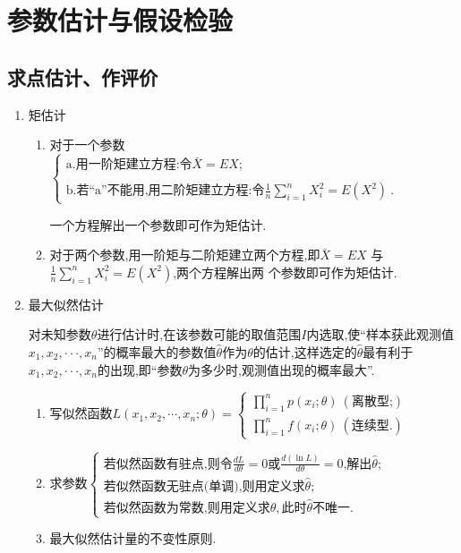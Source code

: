\chapter{参数估计与假设检验}
\section{求点估计、作评价}
\begin{enumerate}
      \item 矩估计
            \begin{enumerate}
                  \item 对于一个参数$\begin{cases}\text{a.用一阶矩建立方程:令}\bar{X}=EX;\\\\\text{b.若“a”不能用,用二阶矩建立方程:令}\frac1n\sum_{i=1}^nX_i^2=E(X^2)\:.\end{cases}$

                        一个方程解出一个参数即可作为矩估计.
                  \item 对于两个参数,用一阶矩与二阶矩建立两个方程,即$\bar{X}=EX$ 与$\frac1n\sum_{i=1}^nX_i^2=E(X^2)$,两个方程解出两
                        个参数即可作为矩估计.
            \end{enumerate}
      \item 最大似然估计

            对未知参数$\theta$进行估计时,在该参数可能的取值范围$I$内选取,使“样本获此观测值$x_1,x_2,\cdotp\cdotp\cdotp,x_n$”的概率最大的参数值$\hat{\theta}$作为$\theta$的估计,这样选定的$\hat{\theta}$最有利于$x_1,x_2,\cdotp\cdotp\cdotp,x_n$的出现,即“参数$\theta$为多少时,观测值出现的概率最大”.
            \begin{enumerate}
                  \item 写似然函数$L(x_{1},x_{2},\cdots,x_{n};\theta)=\left\{\begin{array}{l}{\prod_{i=1}^{n}p(x_{i};\theta)\ (\text{离散型;})}\\{\prod_{i=1}^{n}f(x_{i};\theta)\ (\text{连续型.})}\end{array}\right.$
                  \item 求参数$\left\{\begin{array}{l}\text{若似然函数有驻点,则令}\frac{dL}{d\theta}=0\text{或}\frac{d(\ln L)}{d\theta}=0\text{,解出}\hat{\theta};\\\text{若似然函数无驻点(单调),则用定义求}\hat{\theta};\\\text{若似然函数为常数,则用定义求}\hat{\theta},\text{此时}\hat{\theta}\text{不唯一}.\end{array}\right.$
                  \item 最大似然估计量的不变性原则.


\end{enumerate}
\end{enumerate}
